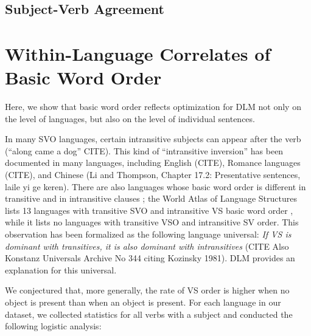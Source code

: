 \documentclass[11pt,a4paper]{article}
\begin{document}
\subsection{Subject-Verb Agreement}

\section{Within-Language Correlates of Basic Word Order}

Here, we show that basic word order reflects optimization for DLM not only on the level of languages, but also on the level of individual sentences.

In many SVO languages, certain intransitive subjects can appear after the verb (``along came a dog'' CITE).
This kind of ``intransitive inversion'' has been documented in many languages, including English (CITE), Romance languages (CITE), and Chinese (Li and Thompson, Chapter 17.2: Presentative sentences, laile yi ge keren).
There are also languages whose basic word order is different in transitive and in intransitive clauses \citep{wals-82}; the World Atlas of Language Structures lists 13 languages with transitive SVO and intransitive VS basic word order \citep{wals-81,wals-82}, while it lists no languages with transitive VSO and intransitive SV order.
This observation has been formalized as the following language universal: \textit{If VS is dominant with transitives, it is also dominant with intransitives} (CITE Also Konstanz Universals Archive No 344 citing Kozinsky 1981).
DLM provides an explanation for this universal.


We conjectured that, more generally, the rate of VS order is higher when no object is present than when an object is present.
For each language in our dataset, we collected statistics for all verbs with a subject and conducted the following logistic analysis:
\end{document}
